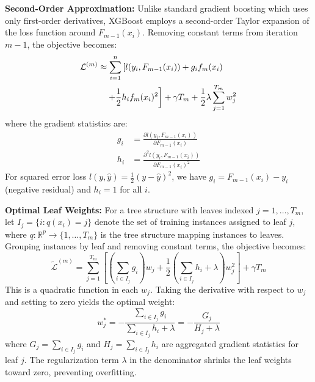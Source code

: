 \documentclass[10pt,twocolumn]{article}
\begin{document}
\textbf{Second-Order Approximation:} Unlike standard gradient boosting which uses only first-order derivatives, XGBoost employs a second-order Taylor expansion of the loss function around $F_{m-1}(x_i)$. Removing constant terms from iteration $m-1$, the objective becomes:
\begin{align}
\mathcal{L}^{(m)} &\approx \sum_{i=1}^n \left[l(y_i, F_{m-1}(x_i)) + g_i f_m(x_i) \right. \notag \\
&\quad \left. + \frac{1}{2}h_i f_m(x_i)^2 \right] + \gamma T_m + \frac{1}{2}\lambda \sum_{j=1}^{T_m} w_j^2
\end{align}
where the gradient statistics are:
\begin{align}
g_i &= \frac{\partial l(y_i, F_{m-1}(x_i))}{\partial F_{m-1}(x_i)} \\
h_i &= \frac{\partial^2 l(y_i, F_{m-1}(x_i))}{\partial F_{m-1}(x_i)^2}
\end{align}
For squared error loss $l(y, \hat{y}) = \frac{1}{2}(y - \hat{y})^2$, we have $g_i = F_{m-1}(x_i) - y_i$ (negative residual) and $h_i = 1$ for all $i$.

\textbf{Optimal Leaf Weights:} For a tree structure with leaves indexed $j = 1, \ldots, T_m$, let $I_j = \{i : q(x_i) = j\}$ denote the set of training instances assigned to leaf $j$, where $q: \mathbb{R}^p \to \{1,\ldots,T_m\}$ is the tree structure mapping instances to leaves. Grouping instances by leaf and removing constant terms, the objective becomes:
\begin{equation}
\tilde{\mathcal{L}}^{(m)} = \sum_{j=1}^{T_m} \left[ \left(\sum_{i \in I_j} g_i\right) w_j + \frac{1}{2}\left(\sum_{i \in I_j} h_i + \lambda\right) w_j^2 \right] + \gamma T_m
\end{equation}
This is a quadratic function in each $w_j$. Taking the derivative with respect to $w_j$ and setting to zero yields the optimal weight:
\begin{equation}
w_j^* = -\frac{\sum_{i \in I_j} g_i}{\sum_{i \in I_j} h_i + \lambda} = -\frac{G_j}{H_j + \lambda}
\end{equation}
where $G_j = \sum_{i \in I_j} g_i$ and $H_j = \sum_{i \in I_j} h_i$ are aggregated gradient statistics for leaf $j$. The regularization term $\lambda$ in the denominator shrinks the leaf weights toward zero, preventing overfitting.
\end{document}
